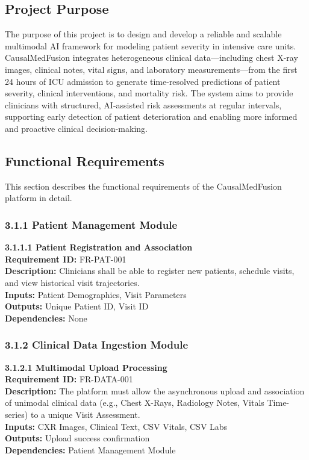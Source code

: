 \documentclass{fisatprojectfinal}
\begin{document}
\subsection{Project Purpose}
The purpose of this project is to design and develop a reliable and scalable multimodal AI framework for modeling patient severity in intensive care units. CausalMedFusion integrates heterogeneous clinical data—including chest X-ray images, clinical notes, vital signs, and laboratory measurements—from the first 24 hours of ICU admission to generate time-resolved predictions of patient severity, clinical interventions, and mortality risk.
The system aims to provide clinicians with structured, AI-assisted risk assessments at regular intervals, supporting early detection of patient deterioration and enabling more informed and proactive clinical decision-making.

\subsection{Functional Requirements}
This section describes the functional requirements of the CausalMedFusion platform in detail.

\subsubsection{3.1.1 Patient Management Module}
\textbf{3.1.1.1 Patient Registration and Association} \\
\textbf{Requirement ID:} FR-PAT-001 \\
\textbf{Description:} Clinicians shall be able to register new patients, schedule visits, and view historical visit trajectories. \\
\textbf{Inputs:} Patient Demographics, Visit Parameters \\
\textbf{Outputs:} Unique Patient ID, Visit ID \\
\textbf{Dependencies:} None

\subsubsection{3.1.2 Clinical Data Ingestion Module}
\textbf{3.1.2.1 Multimodal Upload Processing} \\
\textbf{Requirement ID:} FR-DATA-001 \\
\textbf{Description:} The platform must allow the asynchronous upload and association of unimodal clinical data (e.g., Chest X-Rays, Radiology Notes, Vitals Time-series) to a unique Visit Assessment. \\
\textbf{Inputs:} CXR Images, Clinical Text, CSV Vitals, CSV Labs \\
\textbf{Outputs:} Upload success confirmation \\
\textbf{Dependencies:} Patient Management Module
\end{document}
